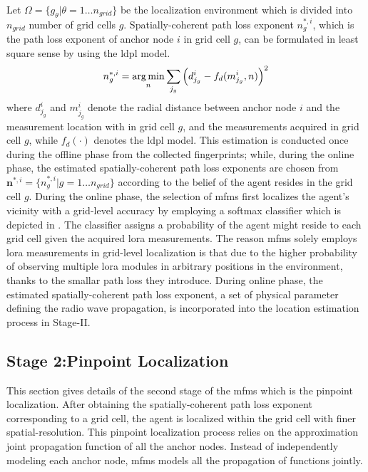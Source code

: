     Let $\Omega=\{g_\theta | \theta=1\ldots n_{grid}\}$ be the localization environment which is divided into $n_{grid}$ number of grid cells $g$.
    Spatially-coherent path loss exponent $n^{*,i}_g$, which is the path loss exponent of anchor node $i$ in grid cell $g$, can be formulated in least square sense by using the \gls{ldpl} model.
    \begin{equation}
       n^{*,i}_g = \operatorname*{arg\,min}_n{\sum_{j_g} \left(d^i_{j_g} - f_d(m^i_{j_g},n)\right)^2}
    \end{equation}
    where $d^i_{j_g}$ and $m^i_{j_g}$ denote the radial distance between anchor node $i$ and the measurement location with in grid cell $g$, and the measurements acquired in grid cell $g$, while $f_d(\cdot)$ denotes the \gls{ldpl} model.
    This estimation is conducted once during the offline phase from the collected fingerprints; while, during the online phase, the estimated spatially-coherent path loss exponents are chosen from $\bm{n}^{*,i} =\{n^{*,i}_g | g=1\ldots n_{grid}\}$ according to the belief of the agent resides in the grid cell $g$.
    During the online phase, the selection of \gls{mfms} first localizes the agent's vicinity with a grid-level accuracy by employing a softmax classifier which is depicted in .
    The classifier assigns a probability of the agent might reside to each grid cell given the acquired \gls{lora} measurements.
    The reason \gls{mfms} solely employs \gls{lora} measurements in grid-level localization is that due to the higher probability of observing multiple \gls{lora} modules in arbitrary positions in the environment, thanks to the smallar path loss they introduce.
    During online phase, the estimated spatially-coherent path loss exponent, a set of physical parameter defining the radio wave propagation, is incorporated into the location estimation process in Stage-II\@.



    \subsection{Stage 2:Pinpoint Localization}
    This section gives details of the second stage of the \gls{mfms} which is the pinpoint localization.
    After obtaining the spatially-coherent path loss exponent corresponding to a grid cell, the agent is localized within the grid cell with finer spatial-resolution.
    This pinpoint localization process relies on the approximation joint propagation function of all the anchor nodes.
    Instead of independently modeling each anchor node, \gls{mfms} models all the propagation of functions jointly.

